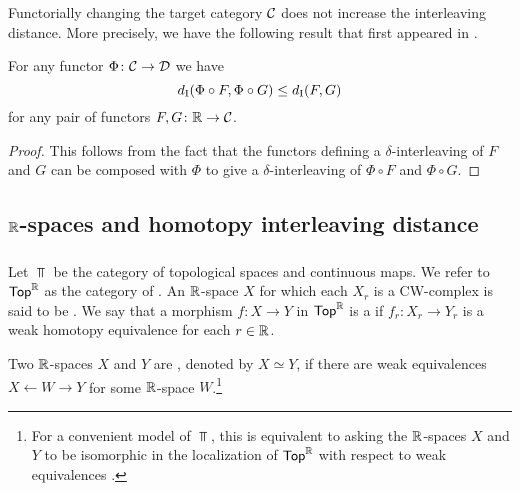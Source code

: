Functorially changing the target category $\mathcal{C}$ does not increase the interleaving distance.
More precisely, we have the following result that first appeared in \cite[p.~1508]{bubenik2015metrics}.

\medskip\lemma For any functor $\Phi \colon \mathcal{C} \to \mathcal{D}$ we have
\[
d_{\mathrm{I}}(\Phi \circ F, \Phi \circ G) \leq d_{\mathrm{I}}(F, G)
\]
for any pair of functors $F, G \colon \mathbb{R} \to \mathcal{C}$.

\begin{proof}
	This follows from the fact that the functors defining a $\delta$-interleaving of $F$ and $G$ can be composed with $\Phi$ to give a $\delta$-interleaving of $\Phi \circ F$ and $\Phi \circ G$.
\end{proof}


\subsection{$\mathbb{R}$-spaces and homotopy interleaving distance}

\subsubsection{}\label{ss:R-spaces}

Let $\Top$ be the category of topological spaces and continuous maps.
We refer to $\mathsf{Top}^{\mathbb{R}}$ as the category of .
An $\mathbb{R}$-space $X$ for which each $X_r$ is a CW-complex is said to be .
We say that a morphism $f \colon X \to Y$ in $\mathsf{Top}^{\mathbb{R}}$ is a  if $f_r \colon X_r \to Y_r$ is a weak homotopy equivalence for each $r \in \mathbb{R}$.

Two $\mathbb{R}$-spaces $X$ and $Y$ are , denoted by $X \simeq Y$, if there are weak equivalences $X \leftarrow W \rightarrow Y$ for some $\mathbb{R}$-space $W$.\footnote{
For a convenient model of $\Top$, this is equivalent to asking the $\mathbb{R}$-spaces $X$ and $Y$ to be isomorphic in the localization of $\mathsf{Top}^{\mathbb{R}}$ with respect to weak equivalences \cite{blumberg2023interleaving}.}

